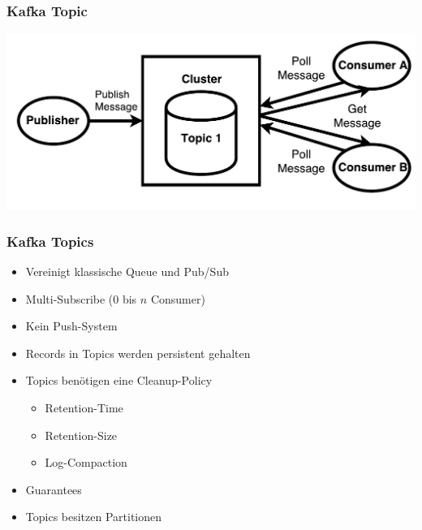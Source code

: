 \begin{frame}
\frametitle{Kafka Topic}
\centering
\includegraphics[scale=0.6]{figure/Kafka_topic_draw_Poll.pdf}
\end{frame}

\begin{frame}
\frametitle{Kafka Topics}
\begin{itemize}
	\item Vereinigt klassische Queue und Pub/Sub
	\item Multi-Subscribe ($0$ bis $n$ Consumer)		%
	\item Kein Push-System
	\item Records in Topics werden persistent gehalten
	\item Topics benötigen eine Cleanup-Policy
		\begin{itemize}
			\item Retention-Time
			\item Retention-Size
			\item Log-Compaction
		\end{itemize}
	\item Guarantees
	\item Topics besitzen Partitionen
\end{itemize}


\end{frame}

